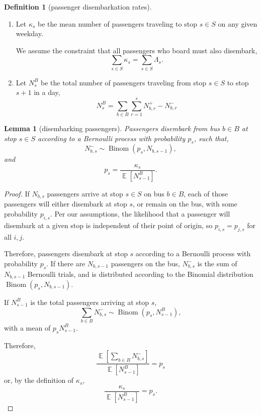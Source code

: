 \documentclass[12pt]{article}
\newtheorem{lemma}{Lemma}
\theoremstyle{definition}
\newtheorem{definition}{Definition}
\DeclareMathOperator{\Exp}{\mathbb E}
\DeclareMathOperator{\Binom}{Binom}
\begin{document}
\begin{definition}[passenger disembarkation rates]
    \hfill
    \begin{enumerate}
        \item 
            Let $\kappa_s$ be the mean number of passengers traveling to stop
            $s \in S$ on any given weekday.

            We assume the constraint that all passengers who board must also
            disembark,
            \[
                \sum_{s \in S} \kappa_s = \sum_{s \in S} \Lambda_s.
            \]

        \item Let $N^B_s$ be the total number of passengers traveling from
            stop $s \in S$ to stop $s+1$ in a day,
            \[
                N^B_s = \sum_{b \in B} \sum_{r=1}^s
                N^+_{b,r} - N^-_{b,r}
            \]
    \end{enumerate}
\end{definition}

\begin{lemma}[disembarking passengers]
    \label{lem:p_s}
    Passengers disembark from bus $b \in B$ at stop $s \in S$ according to a
    Bernoulli process with probability $p_s$, such that,
    \[
        N^-_{b,s} \sim \Binom(p_s, N_{b,s-1}),
    \]
    and
    \[
        p_s = \frac{\kappa_s}{\Exp[N^B_{s-1}]}.
    \]
\end{lemma}

\begin{proof}
    If $N_{b,s}$ passengers arrive at stop $s \in S$ on bus $b \in B$,
    each of those passengers will either disembark at stop $s$, or remain on
    the bus, with some probability $p_{i,s}$. Per our assumptions, the likelihood
    that a passenger will disembark at a given stop is independent of their
    point of origin, so $p_{i,s} = p_{j,s}$ for all $i,j$.

    Therefore, passengers disembark at stop $s$ according to a Bernoulli
    process with probability $p_s$. If there are $N_{b,s-1}$ passengers on the
    bus, $N^-_{b,s}$ is the sum of $N_{b,s-1}$ Bernoulli trials, and is
    distributed according to the Binomial distribution $\Binom(p_s, N_{b,s-1})$.

    If $N^B_{s-1}$ is the total passengers arriving at stop $s$,
    \[
        \sum_{b \in B} N^-_{b,s} \sim \Binom(p_s, N^B_{s-1}),
    \]
    with a mean of $p_s N^B_{s-1}$.

    Therefore,
    \[
        \frac{\Exp[\sum_{b \in B} N^-_{b,s}]}{\Exp[N^B_{s-1}]} = p_s
    \]
    or, by the definition of $\kappa_s$,
    \[
        \frac{\kappa_s}{\Exp[N^B_{s-1}]} = p_s.
    \]
\end{proof}
\end{document}
